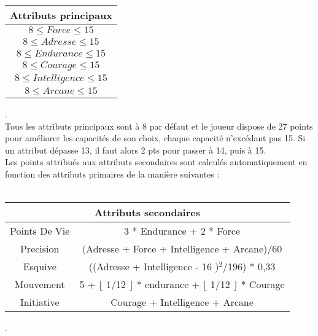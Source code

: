 \documentclass[a4paper,12pt]{report}
\begin{document}
	\begin{center}
		\begin{tabular}{|c|}
			
			\hline
			Attributs principaux \\
			\hline
			$8 \le Force \le 15$ \\
			\hline
			$8 \le Adresse \le 15$ \\
			\hline
			$8 \le Endurance \le 15$ \\
			\hline
			$8 \le Courage \le 15$ \\
			\hline
			$8 \le Intelligence \le 15$ \\
			\hline
			$8 \le Arcane \le 15$ \\
			\hline
			
		\end{tabular}
	\end{center}
	. \\ 
	Tous les attributs principaux sont à 8 par défaut et le joueur dispose de 27 points pour améliorer les capacités de son choix, chaque capacité n'excédant pas 15. Si un attribut dépasse 13, il faut alors 2 pts pour passer à 14, puis à 15. \\
	
	Les points attribués aux attributs secondaires sont calculés automatiquement en fonction des attributs primaires de la manière suivantes : \\ \\
	
	\begin{tabular}{|c|c|}
		\hline
		\multicolumn{2}{|c|}{Attributs secondaires} \\
		\hline
		Points De Vie & 3 * Endurance + 2 * Force \\
		\hline
		Precision & (Adresse + Force + Intelligence + Arcane)/60 \\
		\hline
		Esquive & ((Adresse + Intelligence - 16 )$^2$/196) * 0,33 \\
		\hline
		Mouvement & 5 + $\lfloor$ 1/12 $\rfloor$ * endurance + $\lfloor$ 1/12 $\rfloor$ * Courage \\
		\hline
		Initiative & Courage + Intelligence + Arcane \\
		\hline
	\end{tabular}
	
	.\\ \\ 
	
\end{document}
